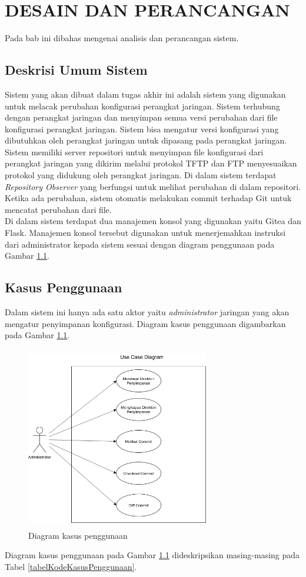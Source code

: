 \chapter{DESAIN DAN PERANCANGAN}
    Pada bab ini dibahas mengenai analisis dan perancangan sistem.
    
    \section{Deskrisi Umum Sistem}
    	Sistem yang akan dibuat dalam tugas akhir ini adalah sistem yang digunakan untuk melacak perubahan konfigurasi perangkat jaringan. Sistem terhubung dengan perangkat jaringan dan menyimpan semua versi perubahan dari file konfigurasi perangkat jaringan. Sistem bisa mengatur versi konfigurasi yang dibutuhkan oleh perangkat jaringan untuk dipasang pada perangkat jaringan.\\
    	
    	\indent Sistem memiliki server repositori untuk menyimpan file konfigurasi dari perangkat jaringan yang dikirim melalui protokol TFTP dan FTP menyesuaikan protokol yang didukung oleh perangkat jaringan. Di dalam sistem terdapat \textit{Repository Observer} yang berfungsi untuk melihat perubahan di dalam repositori. Ketika ada perubahan, sistem otomatis melakukan commit terhadap Git untuk mencatat perubahan dari file.\\
    	
    	\indent Di dalam sistem terdapat dua manajemen konsol yang digunakan yaitu Gitea dan Flask. Manajemen konsol tersebut digunakan untuk menerjemahkan instruksi dari administrator kepada sistem sesuai dengan diagram penggunaan pada Gambar \ref{usecase}. 
	
    \section{Kasus Penggunaan}
    	Dalam sistem ini hanya ada satu aktor yaitu \textit{administrator} jaringan yang akan mengatur penyimpanan konfigurasi. Diagram kasus penggunaan digambarkan pada Gambar \ref{usecase}.
        \begin{figure}[H]
			\centering
			\includegraphics[width=8cm,height=8cm]{Images/C-3/UC-2.png}
			\caption{Diagram kasus penggunaan}
			\label{usecase}
		\end{figure}
        \indent Diagram kasus penggunaan pada Gambar \ref{usecase} dideskripsikan masing-masing pada Tabel \ref {tabelKodeKasusPenggunaan}.
        
